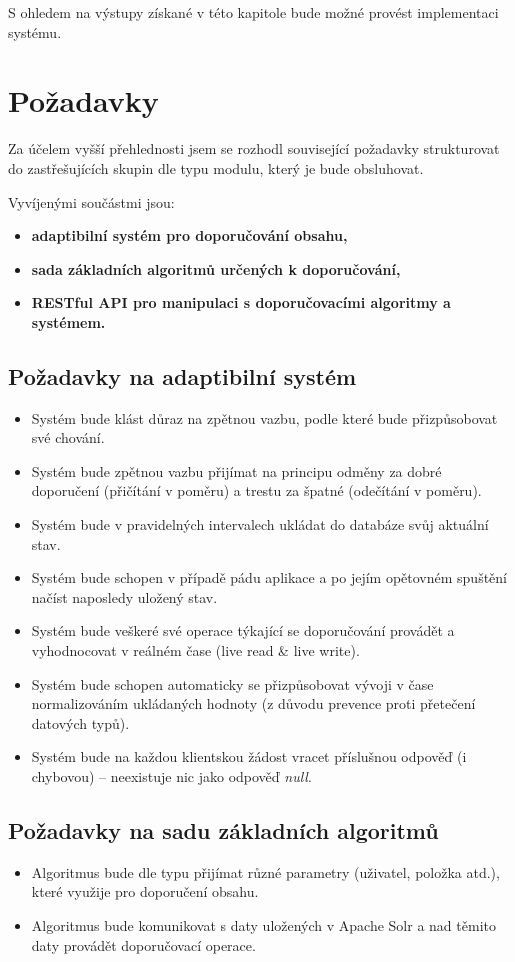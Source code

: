 \documentclass[thesis=M,czech]{FITthesis}[2014/05/07]
\begin{document}
S ohledem na výstupy získané v této kapitole bude možné provést implementaci systému.

\section{Požadavky}
\label{sec:req}
Za účelem vyšší přehlednosti jsem se rozhodl související požadavky strukturovat do zastřešujících skupin dle typu modulu, který je bude obsluhovat.

Vyvíjenými součástmi jsou:

\begin{itemize}
  \item \textbf{adaptibilní systém pro doporučování obsahu,}
  \item \textbf{sada základních algoritmů určených k doporučování,}
  \item \textbf{RESTful API pro manipulaci s doporučovacími algoritmy a systémem.}
\end{itemize}

\subsection{Požadavky na adaptibilní systém}

\begin{itemize}
	\item Systém bude klást důraz na zpětnou vazbu, podle které bude přizpůsobovat své chování.
	\item Systém bude zpětnou vazbu přijímat na principu odměny za dobré doporučení (přičítání v poměru) a trestu za špatné (odečítání v poměru).
	\item Systém bude v pravidelných intervalech ukládat do databáze svůj aktuální stav.
	\item Systém bude schopen v případě pádu aplikace a po jejím opětovném spuštění načíst naposledy uložený stav.
	\item Systém bude veškeré své operace týkající se doporučování provádět a vyhodnocovat v reálném čase (live read \& live write).
	\item Systém bude schopen automaticky se přizpůsobovat vývoji v čase normalizováním ukládaných hodnoty (z důvodu prevence proti přetečení datových typů).	
	\item Systém bude na každou klientskou žádost vracet příslušnou odpověď (i chybovou) – neexistuje nic jako odpověď \emph{null}.	
\end{itemize}

\subsection{Požadavky na sadu základních algoritmů}
\begin{itemize}
	\item Algoritmus bude dle typu přijímat různé parametry (uživatel, položka atd.), které využije pro doporučení obsahu.
	\item Algoritmus bude komunikovat s daty uložených v Apache Solr a nad těmito daty provádět doporučovací operace.
\end{itemize}
\end{document}
